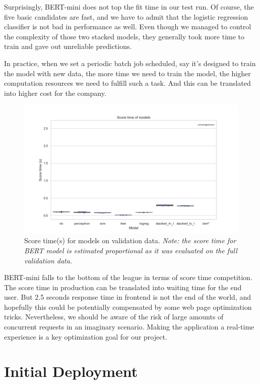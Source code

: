 \documentclass[
	a4paper,
	fontsize=10pt, %
	twoside=false, %
	secnumdepth=2, %
]{kaohandt}
\begin{document}
Surprisingly, BERT-mini does not top the fit time in our test run. Of course, the five basic candidates are fast, and we have to admit that the logistic regression classifier is not bad in performance as well. Even though we managed to control the complexity of those two stacked models, they generally took more time to train and gave out unreliable predictions.

In practice, when we set a periodic batch job scheduled, say it’s designed to train the model with new data, the more time we need to train the model, the higher computation resources we need to fulfill such a task. And this can be translated into higher cost for the company.

\begin{figure}[h]
	\includegraphics[]{metric_score_time.png}
	\caption{Score time(s) for models on validation data. \emph{Note: the score time for BERT model is estimated proportional as it was evaluated on the full validation data.}}
	\label{fig:score_time}
\end{figure}


BERT-mini falls to the bottom of the league in terms of score time competition. The score time in production can be translated into waiting time for the end user. But 2.5 seconds response time in frontend is not the end of the world, and hopefully this could be potentially compensated by some web page optimization tricks. Nevertheless, we should be aware of the risk of large amounts of concurrent requests in an imaginary scenario. Making the application a real-time experience is a key optimization goal for our project.

\section{Initial Deployment}
\end{document}
